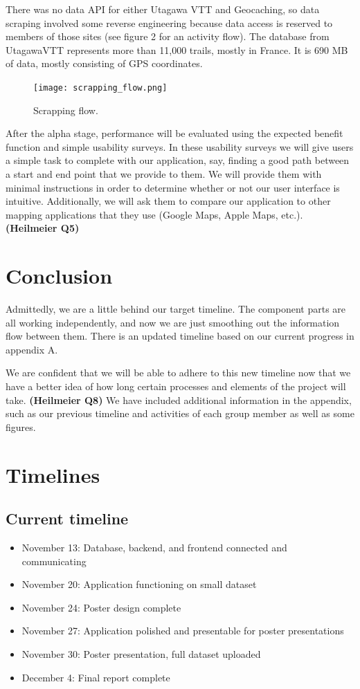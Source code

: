 \documentclass[sigconf]{acmart}
\begin{document}
There was no data API for either Utagawa VTT and Geocaching, so data scraping involved some reverse engineering because data access is reserved to members of those sites (see figure 2 for an activity flow). The database from UtagawaVTT represents more than 11,000 trails, mostly in France. It is 690 MB of data, mostly consisting of GPS coordinates.

\begin{figure}
\texttt{[image: scrapping\_flow.png]}
\caption{Scrapping flow.}
\end{figure}

After the alpha stage,  performance will be evaluated using the expected benefit function and simple usability surveys. In these usability surveys we will give users a simple task to complete with our application, say, finding a good path between a start and end point that we provide to them. We will provide them with minimal instructions in order to determine whether or not our user interface is intuitive. Additionally, we will ask them to compare our application to other mapping applications that they use (Google Maps, Apple Maps, etc.). \textbf{(Heilmeier Q5)}

\section{Conclusion}

Admittedly, we are a little behind our target timeline. The component parts are all working independently, and now we are just smoothing out the information flow between them. There is an updated timeline based on our current progress in appendix A.

We are confident that we will be able to adhere to this new timeline now that we have a better idea of how long certain processes and elements of the project will take. \textbf{(Heilmeier Q8)} We have included additional information in the appendix, such as our previous timeline and activities of each group member as well as some figures.

\appendix
\section{Timelines}
\subsection{Current timeline}

\begin{itemize}
	\item November 13: Database, backend, and frontend connected and communicating
	\item November 20: Application functioning on small dataset
	\item November 24: Poster design complete
	\item November 27: Application polished and presentable for poster presentations
	\item November 30: Poster presentation, full dataset uploaded
	\item December 4: Final report complete
\end{itemize}
\end{document}
